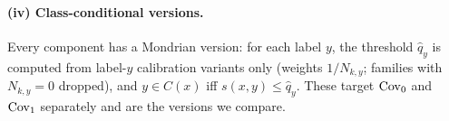\paragraph{(iv) Class-conditional versions.}
Every component has a Mondrian version: for each label $y$, the threshold $\hat q_y$ is computed from label-$y$ calibration variants only (weights $1/N_{k,y}$; families with $N_{k,y}=0$ dropped), and $y\in C(x)$ iff $s(x,y)\le\hat q_y$. These target $\mathrm{Cov}_0$ and $\mathrm{Cov}_1$ separately and are the versions we compare.
